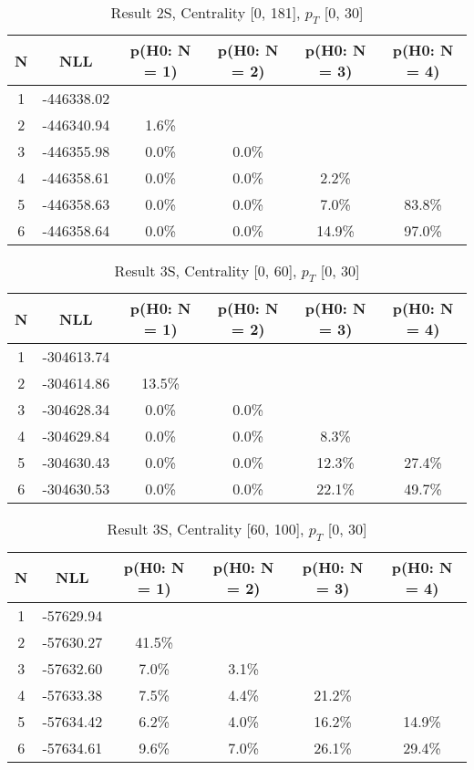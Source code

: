 \begin{table}[htb]
	\begin{center}
	\caption{Result 2S, Centrality [0, 181], $p_{T}$ [0, 30]
}
{\footnotesize\renewcommand{\arraystretch}{1.4}
		\begin{tabular}{cc||cccc}
			N & NLL & p(H0: N = 1) & p(H0: N = 2) & p(H0: N = 3) & p(H0: N = 4)\\ 
		\hline
1 & -446338.02 & & & & \\
2 & -446340.94 & 1.6\% & & & \\
3 & -446355.98 & 0.0\% & 0.0\% & & \\
4 & -446358.61 & 0.0\% & 0.0\% & 2.2\% & \\
5 & -446358.63 & 0.0\% & 0.0\% & 7.0\% & 83.8\% \\
6 & -446358.64 & 0.0\% & 0.0\% & 14.9\% & 97.0\% \\
	\end{tabular}
		\label{tab:lab}
	}
	\end{center}\end{table}

\begin{table}[htb]
	\begin{center}
	\caption{Result 3S, Centrality [0, 60], $p_{T}$ [0, 30]
}
{\footnotesize\renewcommand{\arraystretch}{1.4}
		\begin{tabular}{cc||cccc}
			N & NLL & p(H0: N = 1) & p(H0: N = 2) & p(H0: N = 3) & p(H0: N = 4)\\ 
		\hline
1 & -304613.74 & & & & \\
2 & -304614.86 & 13.5\% & & & \\
3 & -304628.34 & 0.0\% & 0.0\% & & \\
4 & -304629.84 & 0.0\% & 0.0\% & 8.3\% & \\
5 & -304630.43 & 0.0\% & 0.0\% & 12.3\% & 27.4\% \\
6 & -304630.53 & 0.0\% & 0.0\% & 22.1\% & 49.7\% \\
	\end{tabular}
		\label{tab:lab}
	}
	\end{center}\end{table}

\begin{table}[htb]
	\begin{center}
	\caption{Result 3S, Centrality [60, 100], $p_{T}$ [0, 30]
}
{\footnotesize\renewcommand{\arraystretch}{1.4}
		\begin{tabular}{cc||cccc}
			N & NLL & p(H0: N = 1) & p(H0: N = 2) & p(H0: N = 3) & p(H0: N = 4)\\ 
		\hline
1 & -57629.94 & & & & \\
2 & -57630.27 & 41.5\% & & & \\
3 & -57632.60 & 7.0\% & 3.1\% & & \\
4 & -57633.38 & 7.5\% & 4.4\% & 21.2\% & \\
5 & -57634.42 & 6.2\% & 4.0\% & 16.2\% & 14.9\% \\
6 & -57634.61 & 9.6\% & 7.0\% & 26.1\% & 29.4\% \\
	\end{tabular}
		\label{tab:lab}
	}
	\end{center}\end{table}

